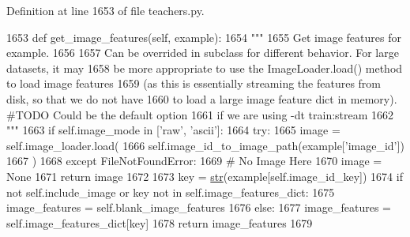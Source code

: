 Definition at line 1653 of file teachers.\+py.


\begin{DoxyCode}
1653     \textcolor{keyword}{def }get\_image\_features(self, example):
1654         \textcolor{stringliteral}{"""}
1655 \textcolor{stringliteral}{        Get image features for example.}
1656 \textcolor{stringliteral}{}
1657 \textcolor{stringliteral}{        Can be overrided in subclass for different behavior. For large datasets, it may}
1658 \textcolor{stringliteral}{        be more appropriate to use the ImageLoader.load() method to load image features}
1659 \textcolor{stringliteral}{        (as this is essentially streaming the features from disk, so that we do not have}
1660 \textcolor{stringliteral}{        to load a large image feature dict in memory). #TODO Could be the default option}
1661 \textcolor{stringliteral}{        if we are using -dt train:stream}
1662 \textcolor{stringliteral}{        """}
1663         \textcolor{keywordflow}{if} self.image\_mode \textcolor{keywordflow}{in} [\textcolor{stringliteral}{'raw'}, \textcolor{stringliteral}{'ascii'}]:
1664             \textcolor{keywordflow}{try}:
1665                 image = self.image\_loader.load(
1666                     self.image\_id\_to\_image\_path(example[\textcolor{stringliteral}{'image\_id'}])
1667                 )
1668             \textcolor{keywordflow}{except} FileNotFoundError:
1669                 \textcolor{comment}{# No Image Here}
1670                 image = \textcolor{keywordtype}{None}
1671             \textcolor{keywordflow}{return} image
1672 
1673         key = \hyperlink{namespacegenerate__task__READMEs_a5b88452ffb87b78c8c85ececebafc09f}{str}(example[self.image\_id\_key])
1674         \textcolor{keywordflow}{if} \textcolor{keywordflow}{not} self.include\_image \textcolor{keywordflow}{or} key \textcolor{keywordflow}{not} \textcolor{keywordflow}{in} self.image\_features\_dict:
1675             image\_features = self.blank\_image\_features
1676         \textcolor{keywordflow}{else}:
1677             image\_features = self.image\_features\_dict[key]
1678         \textcolor{keywordflow}{return} image\_features
1679 
\end{DoxyCode}
\mbox{\label{classparlai_1_1core_1_1teachers_1_1AbstractImageTeacher_a29fce019ea9795947235ba208aa4bfb0}} 
